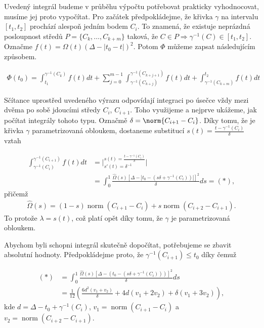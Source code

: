 Uvedený integrál budeme v průběhu výpočtu potřebovat prakticky vyhodnocovat,
musíme jej proto vypočítat. Pro začátek předpokládejme, že křivka $ \gamma $ na
intervalu $ [t_1, t_2] $ prochází alespoň jedním bodem $ C_i $. To znamená, že
existuje neprázdná posloupnost středů $ P = \{C_k, \dots, C_{k + m} \}$ taková, že
$ C \in P \Rightarrow \gamma^{-1}(C) \in [t_1, t_2]$. Označme
$ f(t) = \Omega(t) (\Delta - \left| t_0 - t \right| )^2 $. Potom $ \Phi $ můžeme zapsat
následujícím způsobem.

\begin{align} \label{eq:integral_sum}
    \Phi(t_0) = \int_{t_1}^{\gamma^{-1}(C_k)} f(t) dt
        + \sum_{j=0}^{m - 1} \int_{\gamma^{-1}(C_{k + j})}^{\gamma^{-1}(C_{k + j + 1})} f(t) dt
        + \int_{\gamma^{-1}(C_{k + m})}^{t_2} f(t) dt
\end{align}

Sčítance uprostřed uvedeného výrazu odpovídají integraci po úsečce vždy mezi
dvěma po sobě jdoucími středy $ C_i $, $C_{i+1} $. Toho využijeme a nejprve ukážeme,
jak počítat integrály tohoto typu. Označmě $\delta = \norm{C_{i + 1} - C_i}$.
Díky tomu, že je křivka $ \gamma $ parametrizovaná
obloukem, dostaneme substitucí
$ s(t) = \frac{t - \gamma^{-1}(C_i)}{\delta} $ vztah

\begin{align*}
    \int_{\gamma^{-1}(C_{i})}^{\gamma^{-1}(C_{i + 1})} f(t) dt
    &= \bigg\rvert
        ^{s(t) = \frac{t - \gamma^{-1}(C_i)}{\delta}}
        _{s'(t) = \delta^{-1}} \bigg\lvert \\
    &= \int_{0}^{1}
        \frac{\widehat{\Omega}(s)
            \left[\Delta - \left| t_0 - (s \delta + \gamma^{-1}(C_i)) \right| \right]^2}
        {\delta} ds
    = (*),
\end{align*}
přičemž
\begin{align*}
    \widehat{\Omega}(s) = (1 - s) \operatorname{norm}(C_{i + 1} - C_i)
            + s \operatorname{norm}(C_{i + 2} - C_{i + 1}).
\end{align*}
To protože $ \lambda = s(t) $, což platí opět díky tomu, že $ \gamma $ je
parametrizovaná obloukem.

Abychom byli schopni integrál skutečně dopočítat, potřebujeme se zbavit absolutní
hodnoty. Předpokládejme proto, že $ \gamma^{-1}(C_{i + 1}) \leq t_0$ díky čemuž

\begin{align}
    (*) &= \int_{0}^{1}
        \frac{\widehat{\Omega}(s)
            \left[\Delta - (t_0 - (s \delta + \gamma^{-1}(C_i)) ) \right]^2}
        {\delta}
         ds \\
    &= \frac{1}{12} \left(
        \frac{6 d^2 (v_1+v_2 )}{\delta}
        + 4 d (v_1+2 v_2 )
        + \delta (v_1+3 v_2 ) \right), \label{eq:result_1}
\end{align}
kde $ d = \Delta - t_0 + \gamma^{-1}(C_i) $,
$ v_1 = \operatorname{norm}(C_{i + 1} - C_i) $ a
$ v_2 = \operatorname{norm}(C_{i + 2} - C_{i + 1})$.

